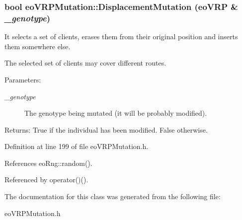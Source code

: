 \subsubsection{\setlength{\rightskip}{0pt plus 5cm}bool eo\-VRPMutation::Displacement\-Mutation (\bf{eo\-VRP} \& {\em \_\-genotype})\hspace{0.3cm}{\tt  [inline, private]}}\label{classeo_v_r_p_mutation_b6b7e818085f6ba03d64f045f32356be}


It selects a set of clients, erases them from their original position and inserts them somewhere else. 

The selected set of clients may cover different routes. \begin{Desc}
\item[Parameters:]
\begin{description}
\item[{\em \_\-genotype}]The genotype being mutated (it will be probably modified). \end{description}
\end{Desc}
\begin{Desc}
\item[Returns:]True if the individual has been modified. False otherwise. \end{Desc}


Definition at line 199 of file eo\-VRPMutation.h.

References eo\-Rng::random().

Referenced by operator()().

The documentation for this class was generated from the following file:\begin{CompactItemize}
\item 
eo\-VRPMutation.h\end{CompactItemize}
